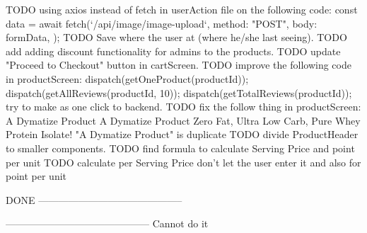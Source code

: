 TODO  using axios instead of fetch in userAction file on the following code: 
       const data = await fetch(`/api/image/image-upload`, {
      method: "POST",
      body: formData,
    });
TODO  Save where the user at (where he/she last seeing).
TODO  add adding discount functionality for admins to the products.
TODO  update "Proceed to Checkout" button in cartScreen.
TODO improve the following code in productScreen:
dispatch(getOneProduct(productId));
dispatch(getAllReviews(productId, 10));
dispatch(getTotalReviews(productId));
try to make as one click to backend.
TODO  fix the follow thing in productScreen:
A Dymatize Product
A Dymatize Product Zero Fat, Ultra Low Carb, Pure Whey Protein Isolate!
"A Dymatize Product" is duplicate
TODO divide ProductHeader to smaller components.
TODO find formula to calculate Serving Price and point per unit
TODO  calculate per Serving Price don't let the user enter it and also for point per unit

DONE
--------------------------------------------



--------------------------------------------
Cannot do it
